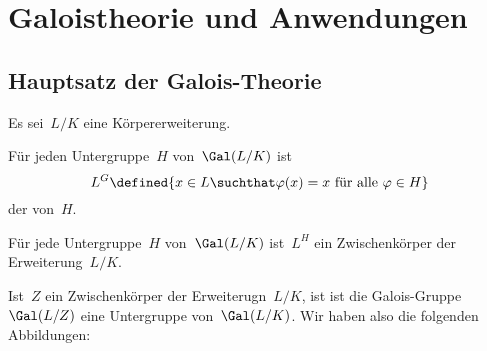 \chapter{Galoistheorie und Anwendungen}





\section{Hauptsatz der Galois-Theorie}

\begin{convention}
  Es sei~$L/K$ eine Körpererweiterung.
\end{convention}


\begin{definition}
  Für jeden Untergruppe~$H$ von~$\Gal(L/K)$ ist
  \[
    L^G
    \defined
    \{
      x \in L
    \suchthat
      \text{$\varphi(x) = x$ für alle~$\varphi \in H$}
    \}
  \]
  der  von~$H$.
\end{definition}

\begin{proposition}
  Für jede Untergruppe~$H$ von~$\Gal(L/K)$ ist~$L^H$ ein Zwischenkörper der Erweiterung~$L/K$.
\end{proposition}

Ist~$Z$ ein Zwischenkörper der Erweiterugn~$L/K$, ist ist die Galois-Gruppe~$\Gal(L/Z)$ eine Untergruppe von~$\Gal(L/K)$.
Wir haben also die folgenden Abbildungen:

